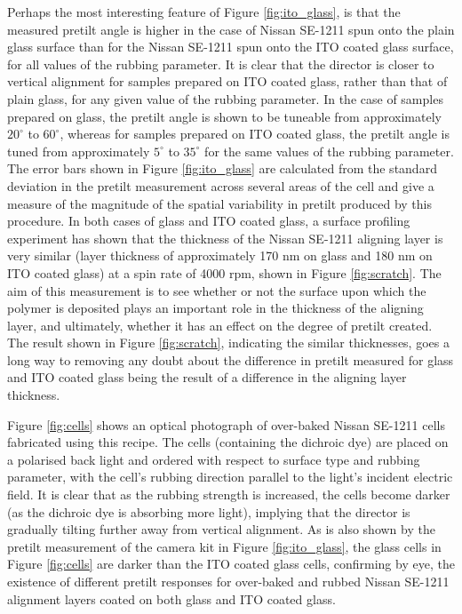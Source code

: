 Perhaps the most interesting feature of Figure \ref{fig:ito_glass}, is that the measured pretilt angle is higher in the case of Nissan SE-1211 spun onto the plain glass surface than for the Nissan SE-1211 spun onto the ITO coated glass surface, for all values of the rubbing parameter. It is clear that the director is closer to vertical alignment for samples prepared on ITO coated glass, rather than that of plain glass, for any given value of the rubbing parameter. In the case of samples prepared on glass, the pretilt angle is shown to be tuneable from approximately $20^{\circ}$ to $60^{\circ}$, whereas for samples prepared on ITO coated glass, the pretilt angle is tuned from approximately $5^{\circ}$ to $35^{\circ}$ for the same values of the rubbing parameter. The error bars shown in Figure \ref{fig:ito_glass} are calculated from the standard deviation in the pretilt measurement across several areas of the cell and give a measure of the magnitude of the spatial variability in pretilt produced by this procedure. In both cases of glass and ITO coated glass, a surface profiling experiment has shown that the thickness of the Nissan SE-1211 aligning layer is very similar (layer thickness of approximately 170 nm on glass and 180 nm on ITO coated glass) at a spin rate of 4000 rpm, shown in Figure \ref{fig:scratch}. The aim of this measurement is to see whether or not the surface upon which the polymer is deposited plays an important role in the thickness of the aligning layer, and ultimately, whether it has an effect on the degree of pretilt created. The result shown in Figure \ref{fig:scratch}, indicating the similar thicknesses, goes a long way to removing any doubt about the difference in pretilt measured for glass and ITO coated glass being the result of a difference in the aligning layer thickness. 

Figure \ref{fig:cells} shows an optical photograph of over-baked Nissan SE-1211 cells fabricated using this recipe. The cells (containing the dichroic dye) are placed on a polarised back light and ordered with respect to surface type and rubbing parameter, with the cell's rubbing direction parallel to the light's incident electric field. It is clear that as the rubbing strength is increased, the cells become darker (as the dichroic dye is absorbing more light), implying that the director is gradually tilting further away from vertical alignment. As is also shown by the pretilt measurement of the camera kit in Figure \ref{fig:ito_glass}, the glass cells in Figure \ref{fig:cells} are darker than the ITO coated glass cells, confirming by eye, the existence of different pretilt responses for over-baked and rubbed Nissan SE-1211 alignment layers coated on both glass and ITO coated glass.

